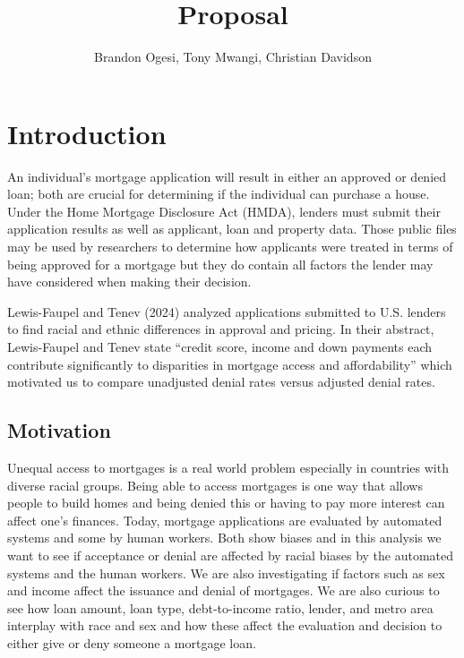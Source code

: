 \documentclass[manuscript,authorversion,nonacm]{acmart}
\begin{document}
\title[Proposal]{Proposal}

\author{Brandon Ogesi, Tony Mwangi, Christian Davidson}

\renewcommand{\shortauthors}{Ogesi, Mwangi, Davidson}

\maketitle

\section{Introduction}

An individual’s mortgage application will result in either an approved or denied loan; both are crucial for determining if the individual can purchase a house. Under the Home Mortgage Disclosure Act (HMDA), lenders must submit their application results as well as applicant, loan and property data. Those public files may be used by researchers to determine how applicants were treated in terms of being approved for a mortgage but they do contain all factors the lender may have considered when making their decision.

Lewis-Faupel and Tenev (2024) analyzed applications submitted to U.S. lenders to find racial and ethnic differences in approval and pricing. In their abstract, Lewis-Faupel and Tenev state ``credit score, income and down payments each contribute significantly to disparities in mortgage access and affordability'' which motivated us to compare unadjusted denial rates versus adjusted denial rates.

\subsection{Motivation}

Unequal access to mortgages is a real world problem especially in countries with diverse racial groups. Being able to access mortgages is one way that allows people to build homes and being denied this or having to pay more interest can affect one's finances. Today, mortgage applications are evaluated by automated systems and some by human workers. Both show biases and in this analysis we want to see if acceptance or denial are affected by racial biases by the automated systems and the human workers. We are also investigating if factors such as sex and income affect the issuance and denial of mortgages. We are also curious to see how loan amount, loan type, debt-to-income ratio, lender, and metro area interplay with race and sex and how these affect the evaluation and decision to either give or deny someone a mortgage loan.
\end{document}
